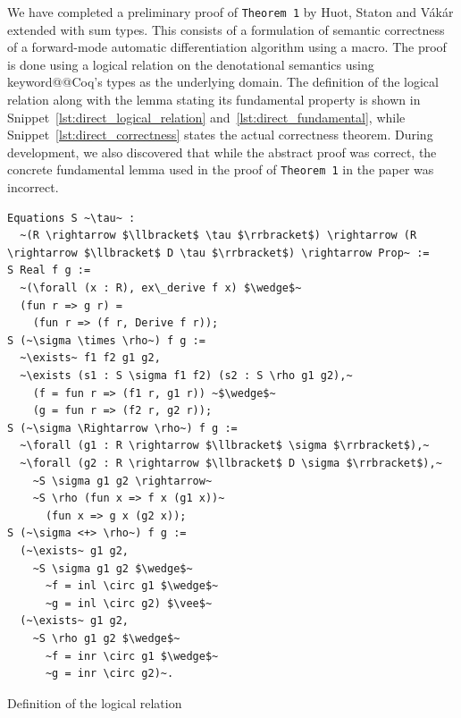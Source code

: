 \documentclass[11pt, final]{article}
\makeatletter
\def\Vakar{V\'{a}k\'{a}r}
\def\<#1>{\csname keyword@@#1\endcsname}
\makeatother
\begin{document}
We have completed a preliminary proof of \texttt{Theorem 1} by Huot, Staton and \Vakar{}\cite{huot2020correctness} extended with sum types.
This consists of a formulation of semantic correctness of a forward-mode automatic differentiation algorithm using a macro.
The proof is done using a logical relation on the denotational semantics using \<Coq>'s types as the underlying domain.
The definition of the logical relation along with the lemma stating its fundamental property is shown in Snippet~\ref{lst:direct_logical_relation} and~\ref{lst:direct_fundamental}, while Snippet~\ref{lst:direct_correctness} states the actual correctness theorem.
During development, we also discovered that while the abstract proof was correct, the concrete fundamental lemma used in the proof of \texttt{Theorem 1} in the paper was incorrect.

\begin{listing}
  \begin{verbatim}
Equations S ~\tau~ :
  ~(R \rightarrow $\llbracket$ \tau $\rrbracket$) \rightarrow (R \rightarrow $\llbracket$ D \tau $\rrbracket$) \rightarrow Prop~ :=
S Real f g :=
  ~(\forall (x : R), ex\_derive f x) $\wedge$~
  (fun r => g r) =
    (fun r => (f r, Derive f r));
S (~\sigma \times \rho~) f g :=
  ~\exists~ f1 f2 g1 g2,
  ~\exists (s1 : S \sigma f1 f2) (s2 : S \rho g1 g2),~
    (f = fun r => (f1 r, g1 r)) ~$\wedge$~
    (g = fun r => (f2 r, g2 r));
S (~\sigma \Rightarrow \rho~) f g :=
  ~\forall (g1 : R \rightarrow $\llbracket$ \sigma $\rrbracket$),~
  ~\forall (g2 : R \rightarrow $\llbracket$ D \sigma $\rrbracket$),~
    ~S \sigma g1 g2 \rightarrow~
    ~S \rho (fun x => f x (g1 x))~
      (fun x => g x (g2 x));
S (~\sigma <+> \rho~) f g :=
  (~\exists~ g1 g2,
    ~S \sigma g1 g2 $\wedge$~
      ~f = inl \circ g1 $\wedge$~
      ~g = inl \circ g2) $\vee$~
  (~\exists~ g1 g2,
    ~S \rho g1 g2 $\wedge$~
      ~f = inr \circ g1 $\wedge$~
      ~g = inr \circ g2)~.
  \end{verbatim}
  \caption{Definition of the logical relation}
  \label{lst:direct_logical_relation}
\end{listing}
\end{document}
